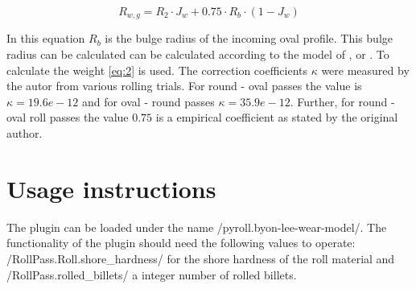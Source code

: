 \documentclass[11pt]{PyRollDocs}
\begin{document}
    \begin{equation}
        R_{w,g} = R_2 \cdot J_w + 0.75 \cdot R_{b} \cdot \left( 1 - J_w \right)
        \label{eq:3}
    \end{equation}

    In this equation $R_b$ is the bulge radius of the incoming oval profile.
    This bulge radius can be calculated can be calculated according to the model of \textcite{Schmidt2017}, \textcite{Byon2017} or \textcite{Lee2001a}.
    To calculate the weight \autoref{eq:2} is used.
    The correction coefficients $\kappa$ were measured by the autor from various rolling trials.
    For round - oval passes the value is $\kappa = 19.6e-12$ and for oval - round passes $\kappa =  35.9e-12$.
    Further, for round - oval roll passes the value $0.75$ is a empirical coefficient as stated by the original author.


    \section{Usage instructions}\label{sec:usage-instructions}

    The plugin can be loaded under the name \py/pyroll.byon-lee-wear-model/.
    The functionality of the plugin should need the following values to operate: \py/RollPass.Roll.shore_hardness/ for the shore hardness of the roll material and \py/RollPass.rolled_billets/ a integer number of rolled billets.



    \printbibliography
\end{document}
